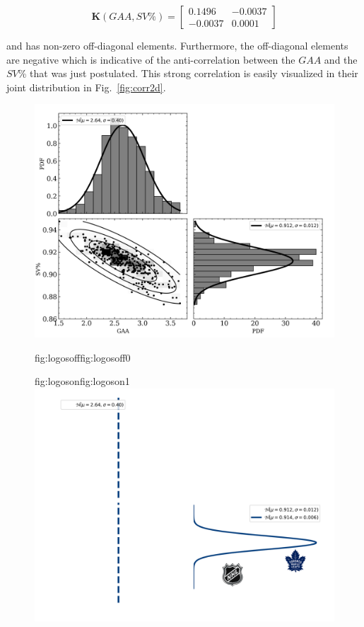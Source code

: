 \begin{equation}
  \mathbf{K}(GAA,SV\%) =
  \begin{bmatrix}
    0.1496 & -0.0037 \\
    -0.0037 & 0.0001
  \end{bmatrix}
  \label{eq:Kcorr}
\end{equation}

\noindent and has non-zero off-diagonal elements. Furthermore, the off-diagonal
elements are negative which is indicative of the anti-correlation between the
$GAA$ and the $SV$\% that was just postulated. This strong correlation
is easily visualized in their joint distribution in Fig.~\ref{fig:corr2d}. \\


\begin{figure}
  \centering
  \includegraphics[width=0.9\hsize]{figures/corr_2D_HARTpost_logo_bkgd.png}%
  \hspace{-0.9\hsize}%
  \begin{ocg}{fig:logosoff}{fig:logosoff}{0}%
  \end{ocg}%
  \begin{ocg}{fig:logoson}{fig:logoson}{1}%
    \includegraphics[width=0.9\hsize]{figures/corr_2D_HARTpost_logo_logos.png}%

\end{ocg}
\end{figure}
